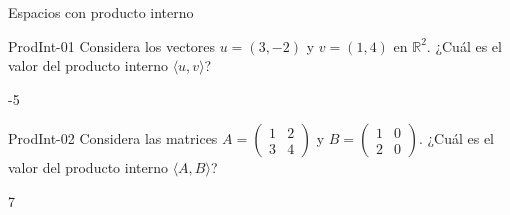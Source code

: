\documentclass[a4,11pt]{aleph-notas}
\begin{document}
\begin{quiz}{Espacios con producto interno}

\begin{numerical}[tolerance=0]%
    {ProdInt-01}
    Considera los vectores \( u = (3, -2) \) y \( v = (1, 4) \) en \( \mathbb{R}^2 \). ¿Cuál es el valor del producto interno \( \langle u , v\rangle \)?
    \item -5
\end{numerical}

\begin{numerical}[tolerance=0]%
    {ProdInt-02}
     Considera las matrices \( A = \begin{pmatrix} 1 & 2 \\ 3 & 4 \end{pmatrix} \) y \( B = \begin{pmatrix} 1 & 0 \\ 2 & 0 \end{pmatrix} \). 
     ¿Cuál es el valor del producto interno \( \langle A , B\rangle \)?
    \item 7
\end{numerical}

\end{quiz}
\end{document}
